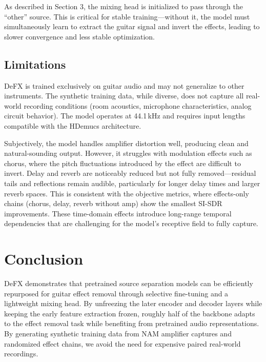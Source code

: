 \documentclass[11pt,twocolumn]{article}
\begin{document}
As described in Section 3, the mixing head is initialized to pass through the ``other'' source. This is critical for stable training---without it, the model must simultaneously learn to extract the guitar signal and invert the effects, leading to slower convergence and less stable optimization.

\subsection{Limitations}

DeFX is trained exclusively on guitar audio and may not generalize to other instruments. The synthetic training data, while diverse, does not capture all real-world recording conditions (room acoustics, microphone characteristics, analog circuit behavior). The model operates at 44.1\,kHz and requires input lengths compatible with the HDemucs architecture.

Subjectively, the model handles amplifier distortion well, producing clean and natural-sounding output. However, it struggles with modulation effects such as chorus, where the pitch fluctuations introduced by the effect are difficult to invert. Delay and reverb are noticeably reduced but not fully removed---residual tails and reflections remain audible, particularly for longer delay times and larger reverb spaces. This is consistent with the objective metrics, where effects-only chains (chorus, delay, reverb without amp) show the smallest SI-SDR improvements. These time-domain effects introduce long-range temporal dependencies that are challenging for the model's receptive field to fully capture.

\section{Conclusion}

DeFX demonstrates that pretrained source separation models can be efficiently repurposed for guitar effect removal through selective fine-tuning and a lightweight mixing head. By unfreezing the later encoder and decoder layers while keeping the early feature extraction frozen, roughly half of the backbone adapts to the effect removal task while benefiting from pretrained audio representations. By generating synthetic training data from NAM amplifier captures and randomized effect chains, we avoid the need for expensive paired real-world recordings.
\end{document}
